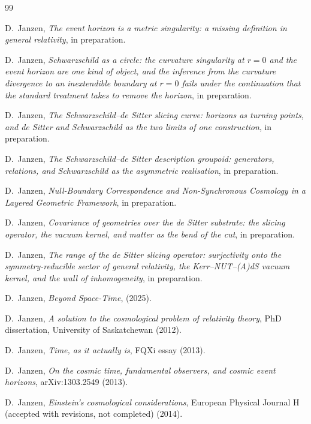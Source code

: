\documentclass[11pt,a4paper]{article}
\theoremstyle{definition}
\begin{document}
\begin{thebibliography}{99}

D.~Janzen,
\emph{The event horizon is a metric singularity: a missing definition in general relativity},
in preparation.

D.~Janzen,
\emph{Schwarzschild as a circle: the curvature singularity at $r=0$ and the event horizon are one kind of object, and the inference from the curvature divergence to an inextendible boundary at $r=0$ fails under the continuation that the standard treatment takes to remove the horizon},
in preparation.

D.~Janzen,
\emph{The Schwarzschild--de Sitter slicing curve: horizons as turning points, and de Sitter and Schwarzschild as the two limits of one construction},
in preparation.

D.~Janzen,
\emph{The Schwarzschild--de Sitter description groupoid: generators, relations, and Schwarzschild as the asymmetric realisation},
in preparation.

D.~Janzen,
\emph{Null-Boundary Correspondence and Non-Synchronous Cosmology in a Layered Geometric Framework},
in preparation.

D.~Janzen,
\emph{Covariance of geometries over the de Sitter substrate: the slicing operator, the vacuum kernel, and matter as the bend of the cut},
in preparation.

D.~Janzen,
\emph{The range of the de Sitter slicing operator: surjectivity onto the symmetry-reducible sector of general relativity, the Kerr--NUT--(A)dS vacuum kernel, and the wall of inhomogeneity},
in preparation.

D.~Janzen,
\emph{Beyond Space-Time},
(2025).

D.~Janzen,
\emph{A solution to the cosmological problem of relativity theory},
PhD dissertation, University of Saskatchewan (2012).

D.~Janzen,
\emph{Time, as it actually is},
FQXi essay (2013).

D.~Janzen,
\emph{On the cosmic time, fundamental observers, and cosmic event horizons},
arXiv:1303.2549 (2013).

D.~Janzen,
\emph{Einstein's cosmological considerations},
European Physical Journal H (accepted with revisions, not completed) (2014).


\end{thebibliography}
\end{document}
